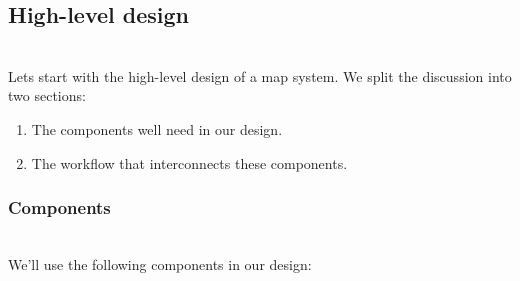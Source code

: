 

\subsection{High-level design}\label{32NFN6-fkAwcjspgfwskN}
\\
Let\textquotesingle s start with the high-level design of a map system. We split the discussion into two sections:

\begin{enumerate}
\item
\protect{}\label{-PR5JqSk3sMe_Xmt3s4Zf}
The components we\textquotesingle ll need in our design.
\item
\protect{}\label{Y6Dod3xmtjClOloM96nqP}
The workflow that interconnects these components.\\
\end{enumerate}

\subsubsection{Components}\label{yOK7D1drhaot30q6GsGIP}
\\
We'll use the following components in our design:

